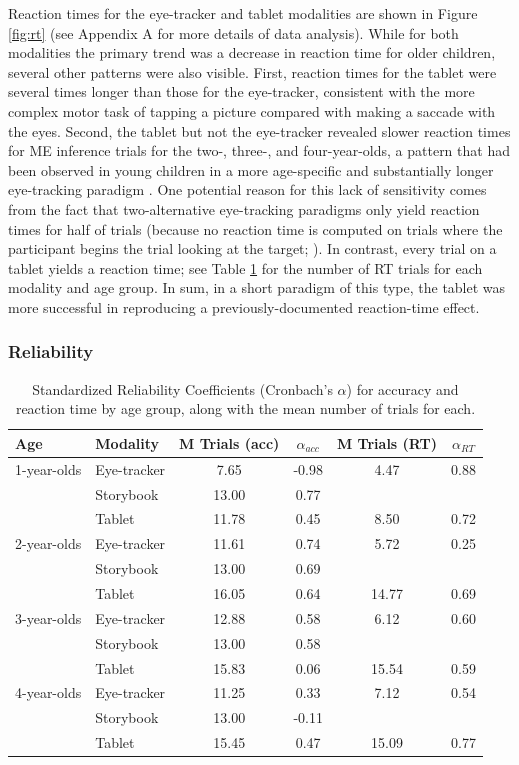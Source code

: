 \documentclass[man,noapacite]{apa2}
\begin{document}
Reaction times for the eye-tracker and tablet modalities are shown in Figure \ref{fig:rt} (see Appendix A for more details of data analysis). While for both modalities the primary trend was a decrease in reaction time for older children, several other patterns were also visible. First, reaction times for the tablet were several times longer than those for the eye-tracker, consistent with the more complex motor task of tapping a picture compared with making a saccade with the eyes. Second, the tablet but not the eye-tracker revealed slower reaction times for ME inference trials for the two-, three-, and four-year-olds, a pattern that had been observed in young children in a more age-specific and substantially longer eye-tracking paradigm \cite{bion2013}. One potential reason for this lack of sensitivity comes from the fact that two-alternative eye-tracking paradigms only yield reaction times for half of trials (because no reaction time is computed on trials where the participant begins the trial looking at the target; ). In contrast, every trial on a tablet yields a reaction time; see Table \ref{tab:reliability} for the number of RT trials for each modality and age group. In sum, in a short paradigm of this type, the tablet was more successful in reproducing a previously-documented reaction-time effect.

\subsubsection{Reliability}

\begin{table}[t]
\centering
\caption{\label{tab:reliability} Standardized Reliability Coefficients (Cronbach's $\alpha$)  for accuracy and reaction time by age group, along with the mean number of trials for each.}
\begin{tabular}{llcccc}
  \hline
Age & Modality & M Trials (acc) & $\alpha_{acc}$ & M Trials (RT) & $\alpha_{RT}$ \\ 
  \hline
1-year-olds & Eye-tracker & 7.65 & -0.98 & 4.47 & 0.88\\ 
    & Storybook & 13.00 & 0.77 & & \\ 
    & Tablet & 11.78 & 0.45 & 8.50 & 0.72\\ 
2-year-olds & Eye-tracker & 11.61 & 0.74 & 5.72 & 0.25 \\ 
    & Storybook & 13.00 & 0.69 & & \\ 
    & Tablet & 16.05 & 0.64 & 14.77 & 0.69\\ 
3-year-olds & Eye-tracker & 12.88 & 0.58 & 6.12 & 0.60\\ 
    & Storybook & 13.00 & 0.58 & & \\ 
    & Tablet & 15.83 & 0.06 & 15.54 & 0.59 \\ 
4-year-olds & Eye-tracker & 11.25 & 0.33  & 7.12 & 0.54 \\ 
    & Storybook & 13.00 & -0.11& &  \\ 
    & Tablet & 15.45 & 0.47 & 15.09 & 0.77 \\ 
   \hline
\end{tabular}
\end{table}
\end{document}
